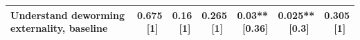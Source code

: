 {\begin{tabular}[t]{lcccccc}
Understand deworming externality, baseline & \makecell[c]{0.675\\\ [1]} & \makecell[c]{0.16\\\ [1]} & \makecell[c]{0.265\\\ [1]} & \makecell[c]{0.03**\\\ [0.36]} & \makecell[c]{0.025**\\\ [0.3]} & \makecell[c]{0.305\\\ [1]}\\
\bottomrule
\end{tabular}}

